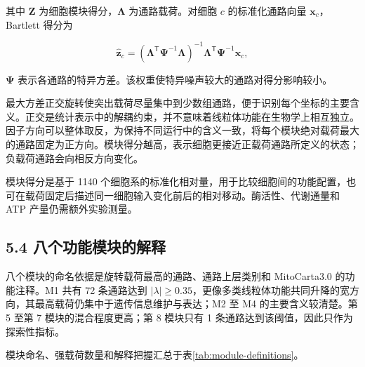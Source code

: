 其中 \(\boldsymbol Z\) 为细胞模块得分，\(\boldsymbol\Lambda\) 为通路载荷。对细胞 \(c\) 的标准化通路向量 \(\boldsymbol x_c\)，Bartlett 得分为

\begin{equation}
\label{eq:bartlett-score}
\widehat{\boldsymbol z}_c=
\left(\boldsymbol\Lambda^{\mathsf T}\boldsymbol\Psi^{-1}\boldsymbol\Lambda\right)^{-1}
\boldsymbol\Lambda^{\mathsf T}\boldsymbol\Psi^{-1}\boldsymbol x_c,
\end{equation}

\(\boldsymbol\Psi\) 表示各通路的特异方差。该权重使特异噪声较大的通路对得分影响较小。

最大方差正交旋转使突出载荷尽量集中到少数组通路，便于识别每个坐标的主要含义。正交是统计表示中的解耦约束，并不意味着线粒体功能在生物学上相互独立。因子方向可以整体取反，为保持不同运行中的含义一致，将每个模块绝对载荷最大的通路固定为正方向。模块得分越高，表示细胞更接近正载荷通路所定义的状态；负载荷通路会向相反方向变化。

模块得分是基于 1140 个细胞系的标准化相对量，用于比较细胞间的功能配置，也可在载荷固定后描述同一细胞输入变化前后的相对移动。酶活性、代谢通量和 ATP 产量仍需额外实验测量。

\hypertarget{54-ux516bux4e2aux529fux80fdux6a21ux5757ux7684ux89e3ux91ca}{%
\subsection{5.4 八个功能模块的解释}\label{54-ux516bux4e2aux529fux80fdux6a21ux5757ux7684ux89e3ux91ca}}

八个模块的命名依据是旋转载荷最高的通路、通路上层类别和 MitoCarta3.0 的功能注释\cite{ref4}。M1 共有 72 条通路达到 \(|\lambda|\geq0.35\)，更像多类线粒体功能共同升降的宽方向，其最高载荷仍集中于遗传信息维护与表达；M2 至 M4 的主要含义较清楚。第 5 至第 7 模块的混合程度更高；第 8 模块只有 1 条通路达到该阈值，因此只作为探索性指标。

模块命名、强载荷数量和解释把握汇总于表\ref{tab:module-definitions}。

